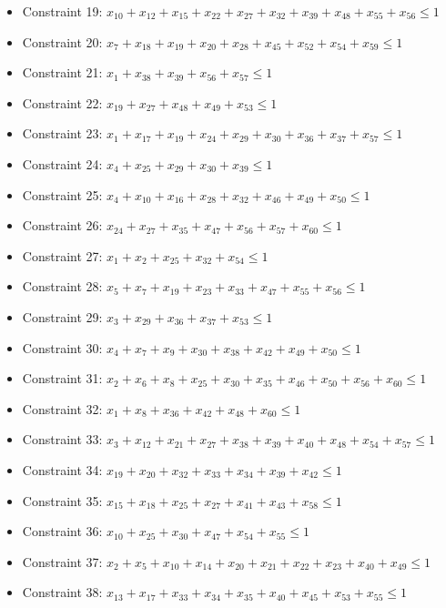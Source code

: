 \documentclass[11pt]{article}
\begin{document}
\begin{itemize}
\item Constraint 19: $x_{10} + x_{12} + x_{15} + x_{22} + x_{27} + x_{32} + x_{39} + x_{48} + x_{55} + x_{56} \le 1$
\item Constraint 20: $x_{7} + x_{18} + x_{19} + x_{20} + x_{28} + x_{45} + x_{52} + x_{54} + x_{59} \le 1$
\item Constraint 21: $x_{1} + x_{38} + x_{39} + x_{56} + x_{57} \le 1$
\item Constraint 22: $x_{19} + x_{27} + x_{48} + x_{49} + x_{53} \le 1$
\item Constraint 23: $x_{1} + x_{17} + x_{19} + x_{24} + x_{29} + x_{30} + x_{36} + x_{37} + x_{57} \le 1$
\item Constraint 24: $x_{4} + x_{25} + x_{29} + x_{30} + x_{39} \le 1$
\item Constraint 25: $x_{4} + x_{10} + x_{16} + x_{28} + x_{32} + x_{46} + x_{49} + x_{50} \le 1$
\item Constraint 26: $x_{24} + x_{27} + x_{35} + x_{47} + x_{56} + x_{57} + x_{60} \le 1$
\item Constraint 27: $x_{1} + x_{2} + x_{25} + x_{32} + x_{54} \le 1$
\item Constraint 28: $x_{5} + x_{7} + x_{19} + x_{23} + x_{33} + x_{47} + x_{55} + x_{56} \le 1$
\item Constraint 29: $x_{3} + x_{29} + x_{36} + x_{37} + x_{53} \le 1$
\item Constraint 30: $x_{4} + x_{7} + x_{9} + x_{30} + x_{38} + x_{42} + x_{49} + x_{50} \le 1$
\item Constraint 31: $x_{2} + x_{6} + x_{8} + x_{25} + x_{30} + x_{35} + x_{46} + x_{50} + x_{56} + x_{60} \le 1$
\item Constraint 32: $x_{1} + x_{8} + x_{36} + x_{42} + x_{48} + x_{60} \le 1$
\item Constraint 33: $x_{3} + x_{12} + x_{21} + x_{27} + x_{38} + x_{39} + x_{40} + x_{48} + x_{54} + x_{57} \le 1$
\item Constraint 34: $x_{19} + x_{20} + x_{32} + x_{33} + x_{34} + x_{39} + x_{42} \le 1$
\item Constraint 35: $x_{15} + x_{18} + x_{25} + x_{27} + x_{41} + x_{43} + x_{58} \le 1$
\item Constraint 36: $x_{10} + x_{25} + x_{30} + x_{47} + x_{54} + x_{55} \le 1$
\item Constraint 37: $x_{2} + x_{5} + x_{10} + x_{14} + x_{20} + x_{21} + x_{22} + x_{23} + x_{40} + x_{49} \le 1$
\item Constraint 38: $x_{13} + x_{17} + x_{33} + x_{34} + x_{35} + x_{40} + x_{45} + x_{53} + x_{55} \le 1$

\end{itemize}
\end{document}
